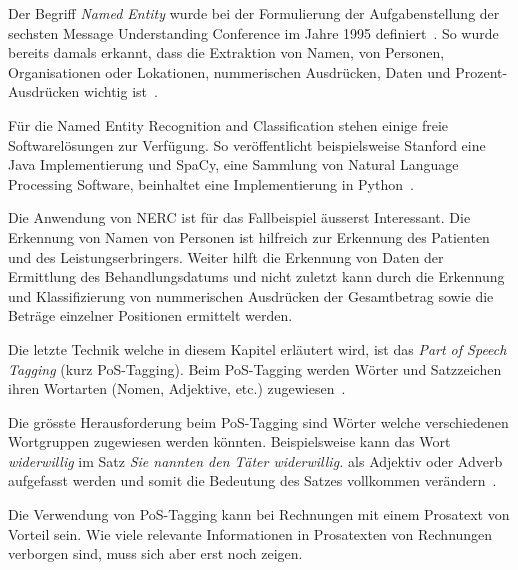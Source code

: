 Der Begriff \textit{Named Entity} wurde bei der Formulierung der Aufgabenstellung der sechsten Message Understanding Conference im Jahre 1995 definiert~\autocite{Borthwick1998}. So wurde bereits damals erkannt, dass die Extraktion von Namen, von Personen, Organisationen oder Lokationen, nummerischen Ausdrücken, Daten und Prozent-Ausdrücken wichtig ist~\autocite{Nadeau2007}.

Für die Named Entity Recognition and Classification stehen einige freie Softwarelösungen zur Verfügung. So veröffentlicht beispielsweise Stanford eine Java Implementierung und SpaCy, eine Sammlung von Natural Language Processing Software, beinhaltet eine Implementierung in Python~\autocite{StanfordNLPGroup, ExplosionAI}.

Die Anwendung von NERC ist für das Fallbeispiel äusserst Interessant. Die Erkennung von Namen von Personen ist hilfreich zur Erkennung des Patienten und des Leistungserbringers. Weiter hilft die Erkennung von Daten der Ermittlung des Behandlungsdatums und nicht zuletzt kann durch die Erkennung und Klassifizierung von nummerischen Ausdrücken der Gesamtbetrag sowie die Beträge einzelner Positionen ermittelt werden.

Die letzte Technik welche in diesem Kapitel erläutert wird, ist das \textit{Part of Speech Tagging} (kurz PoS-Tagging). Beim PoS-Tagging werden Wörter und Satzzeichen ihren Wortarten (Nomen, Adjektive, etc.) zugewiesen~\autocite{Xiao2004}.

Die grösste Herausforderung beim PoS-Tagging sind Wörter welche verschiedenen Wortgruppen zugewiesen werden könnten. Beispielsweise kann das Wort \textit{widerwillig} im Satz \textit{Sie nannten den Täter widerwillig.} als Adjektiv oder Adverb aufgefasst werden und somit die Bedeutung des Satzes vollkommen verändern~\autocite{Volk}.


Die Verwendung von PoS-Tagging kann bei Rechnungen mit einem Prosatext von Vorteil sein. Wie viele relevante Informationen in Prosatexten von Rechnungen verborgen sind, muss sich aber erst noch zeigen.


